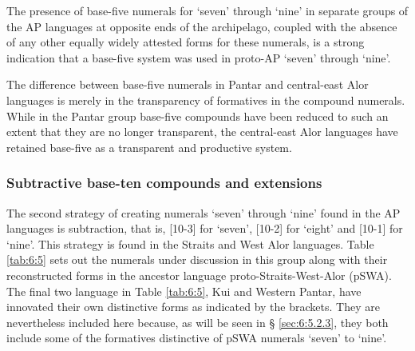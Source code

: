 The presence of base-five numerals for `seven' through `nine' in separate groups of the AP languages at opposite ends of the archipelago, coupled with the absence of any other equally widely attested forms for these numerals, is a strong indication that a base-five system was used in proto-AP `seven' through `nine'. 

The difference between base-five numerals in Pantar and central-east Alor languages is merely in the transparency of formatives in the compound numerals. While in the Pantar group base-five compounds have been reduced to such an extent that they are no longer transparent, the central-east Alor languages have retained base-five as a transparent and productive system. 

\subsubsection{Subtractive base-ten compounds and extensions}\label{sec:6:5.2.2}
The second strategy of creating numerals `seven' through `nine' found in the AP languages is subtraction, that is, [10-3] for `seven', [10-2] for `eight' and  [10-1] for `nine'. This strategy is found in the Straits and West Alor languages. Table \ref{tab:6:5} sets out the numerals under discussion in this group along with their reconstructed forms in the ancestor language proto-Straits-West-Alor (pSWA). The final two language in Table \ref{tab:6:5}, Kui and Western Pantar, have innovated their own distinctive forms as indicated by the brackets. They are nevertheless included here because, as will be seen in {\S} \ref{sec:6:5.2.3}, they both include some of the formatives distinctive of pSWA numerals `seven' to `nine'.




